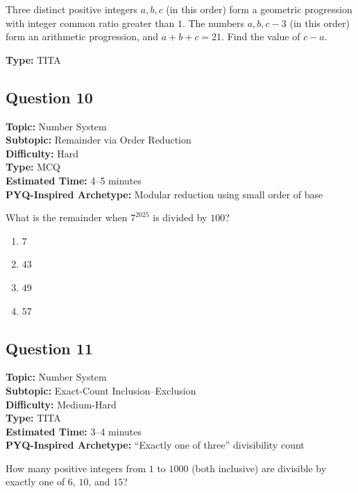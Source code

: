 \documentclass[11pt]{article}
\begin{document}
\begin{tcolorbox}
Three distinct positive integers \(a, b, c\) (in this order) form a geometric progression with integer common ratio greater than \(1\). The numbers \(a, b, c-3\) (in this order) form an arithmetic progression, and \(a + b + c = 21\). Find the value of \(c - a\).
\end{tcolorbox}

\textbf{Type:} TITA

\subsection*{Question 10}

\textbf{Topic:} Number System \\
\textbf{Subtopic:} Remainder via Order Reduction \\
\textbf{Difficulty:} Hard \\
\textbf{Type:} MCQ \\
\textbf{Estimated Time:} 4--5 minutes \\
\textbf{PYQ-Inspired Archetype:} Modular reduction using small order of base

\begin{tcolorbox}
What is the remainder when \(7^{2025}\) is divided by \(100\)?
\end{tcolorbox}

\begin{enumerate}[label=(\Alph*)]
    \item \(7\)
    \item \(43\)
    \item \(49\)
    \item \(57\)
\end{enumerate}

\subsection*{Question 11}

\textbf{Topic:} Number System \\
\textbf{Subtopic:} Exact-Count Inclusion--Exclusion \\
\textbf{Difficulty:} Medium-Hard \\
\textbf{Type:} TITA \\
\textbf{Estimated Time:} 3--4 minutes \\
\textbf{PYQ-Inspired Archetype:} ``Exactly one of three'' divisibility count

\begin{tcolorbox}
How many positive integers from \(1\) to \(1000\) (both inclusive) are divisible by exactly one of \(6\), \(10\), and \(15\)?
\end{tcolorbox}
\end{document}
